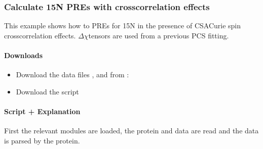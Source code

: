 \documentclass[a4paper,10pt,english,openany,oneside]{sphinxmanual}
\begin{document}
\begin{sphinxVerbatim}[commandchars=\\\{\}]
\end{sphinxVerbatim}

\noindent{}


\subsubsection{Calculate 15N PREs with cross\sphinxhyphen{}correlation effects}
\label{\detokenize{examples/pre_calc_nitrogen:calculate-15n-pres-with-cross-correlation-effects}}\label{\detokenize{examples/pre_calc_nitrogen:pre-calc-nitrogen}}\label{\detokenize{examples/pre_calc_nitrogen::doc}}
\sphinxAtStartPar
This example shows how to PREs for 15N in the presence of CSA\sphinxhyphen{}Curie spin cross\sphinxhyphen{}correlation effects. \({\Delta\chi}\)\sphinxhyphen{}tensors are used from a previous PCS fitting.


\paragraph{Downloads}
\label{\detokenize{examples/pre_calc_nitrogen:downloads}}\begin{itemize}
\item {} 
\sphinxAtStartPar
Download the data files ,  and  from :

\item {} 
\sphinxAtStartPar
Download the script 

\end{itemize}


\paragraph{Script + Explanation}
\label{\detokenize{examples/pre_calc_nitrogen:script-explanation}}
\sphinxAtStartPar
First the relevant modules are loaded, the protein and data are read and the data is parsed by the protein.
\end{document}

